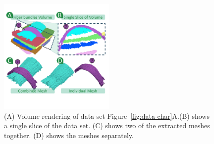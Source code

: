 \begin{figure}
\centering
		\includegraphics[width=0.5\textwidth]{imagesMT2014/image7b}
	\caption{(A) Volume rendering of data set Figure~\ref{fig:data-char}A.(B) shows a single slice of the data set. (C) shows two of the extracted meshes together. (D) shows the meshes separately.}
	\label{fig:crop-16-decomp}
\end{figure}  
  
